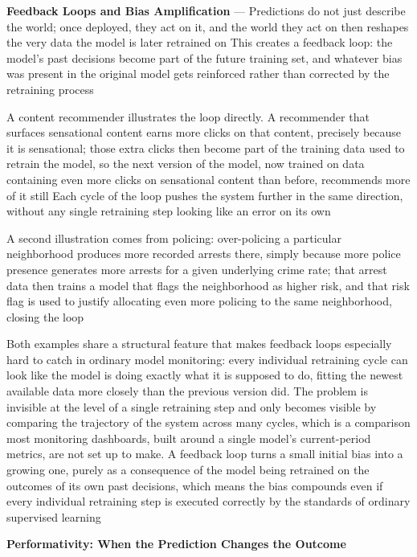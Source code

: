 \textbf{Feedback Loops and Bias Amplification} --- Predictions do not just describe
the world; once deployed, they act on it, and the world they act on then
reshapes the very data the model is later retrained on This creates a feedback
loop: the model's past decisions become part of the future training set, and
whatever bias was present in the original model gets reinforced rather than
corrected by the retraining process

A content recommender illustrates the loop directly. A recommender that surfaces
sensational content earns more clicks on that content, precisely because it is sensational;
those extra clicks then become part of the training data used to retrain the
model, so the next version of the model, now trained on data containing even
more clicks on sensational content than before, recommends more of it still
Each cycle of the loop pushes the system further in the same direction, without any
single retraining step looking like an error on its own

A second illustration comes from policing: over-policing a particular neighborhood
produces more recorded arrests there, simply because more police presence
generates more arrests for a given underlying crime rate; that arrest data then trains
a model that flags the neighborhood as higher risk, and that risk flag is used
to justify allocating even more policing to the same neighborhood, closing the loop

Both examples share a structural feature that makes feedback loops especially
hard to catch in ordinary model monitoring: every individual retraining cycle can
look like the model is doing exactly what it is supposed to do, fitting the
newest available data more closely than the previous version did. The problem is
invisible at the level of a single retraining step and only becomes visible by comparing
the trajectory of the system across many cycles, which is a comparison most
monitoring dashboards, built around a single model's current-period metrics, are
not set up to make. A feedback loop turns a small initial bias into a growing one,
purely as a consequence of the model being retrained on the outcomes of its own
past decisions, which means the bias compounds even if every individual retraining
step is executed correctly by the standards of ordinary supervised learning

\textbf{Performativity: When the Prediction Changes the Outcome}

